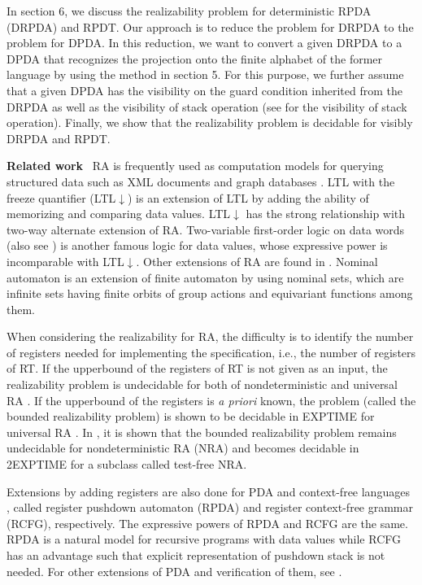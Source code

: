 In section 6, we discuss the realizability problem for deterministic RPDA (DRPDA) and RPDT.
Our approach is to reduce the problem for DRPDA to the problem for DPDA.
In this reduction, we want to convert a given DRPDA to a DPDA that recognizes
the projection onto the finite alphabet of the former language by using the method
in section 5.
For this purpose, we further assume that a given DPDA has the visibility
on the guard condition inherited from the DRPDA as well as the visibility
of stack operation (see \cite{AM04} for the visibility of stack operation).
Finally, we show that the realizability problem is decidable for visibly DRPDA and RPDT.
\medskip\par\noindent
{\bf Related work}~
RA is frequently used as
computation models for querying structured data such as XML documents
and graph databases \cite{LV12,LTV15}.
LTL with the freeze quantifier (LTL$\downarrow$) \cite{DL09,DLN07} is
an extension of LTL by adding the ability of memorizing and comparing data values.
LTL$\downarrow$ has the strong relationship with two-way alternate extension of RA.
Two-variable first-order logic on data words \cite{BDMSS11}(also see \cite{Bo02})
is another famous logic for data values,
whose expressive power is incomparable with LTL$\downarrow$.
Other extensions of RA are found in \cite{BKL14,CLTW17,DFSS19,BCGK12}.
Nominal automaton \cite{BKL14} is an extension of finite automaton
by using nominal sets, which are infinite sets having finite orbits
of group actions and equivariant functions among them.

When considering the realizability for RA,
the difficulty is to identify the number of registers
needed for implementing the specification, i.e., the number of registers of RT.
If the upperbound of the registers of RT is not given as an input,
the realizability problem is undecidable for both of nondeterministic and
universal RA \cite{EFR19}.
If the upperbound of the registers is {\em a priori} known,
the problem (called the bounded realizability
problem) is shown to be decidable in EXPTIME for universal RA \cite{KK19}.
In \cite{EFR19}, it is shown that the bounded realizability problem remains undecidable
for nondeterministic RA (NRA)
and becomes decidable in 2EXPTIME for a subclass called test-free NRA.

Extensions by adding registers are also done for PDA \cite{CL15,MRT17,STS21} and
context-free languages \cite{CK98,STS18,STS19},
called register pushdown automaton (RPDA) and register context-free grammar (RCFG), respectively.
The expressive powers of RPDA and RCFG are the same.
RPDA is a natural model for recursive programs with data values while
RCFG has an advantage such that explicit representation of pushdown stack is not needed.
For other extensions of PDA and verification of them, see \cite{ST12,XO13,RBB10}.
